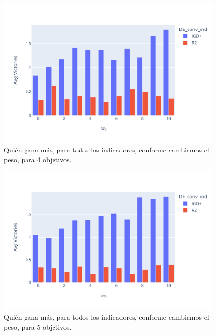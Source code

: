 \begin{figure} [H]
    \centering
    \includegraphics[width=\textwidth]{Figuras/borda_obj_4.pdf}
    \caption[Conteo de borda por número de objetivos]{Quién gana más, para todos los indicadores, conforme cambiamos el peso, para 4 objetivos.}
    \label{fig:borda_obj_4}
\end{figure}

\begin{figure} [H]
    \centering
    \includegraphics[width=\textwidth]{Figuras/borda_obj_5.pdf}
    \caption[Conteo de borda por número de objetivos]{Quién gana más, para todos los indicadores, conforme cambiamos el peso, para 5 objetivos.}
    \label{fig:borda_obj_5}
\end{figure}

